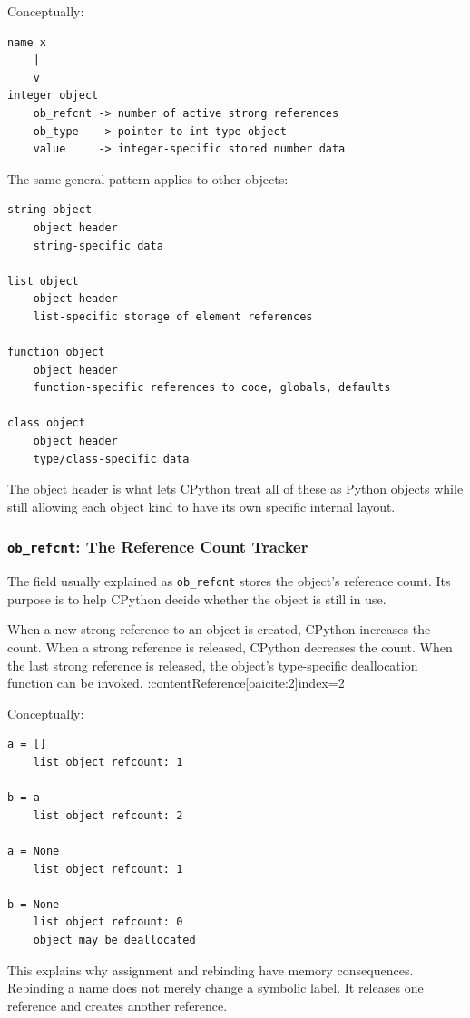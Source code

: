 Conceptually:

\begin{verbatim}
name x
    |
    v
integer object
    ob_refcnt -> number of active strong references
    ob_type   -> pointer to int type object
    value     -> integer-specific stored number data
\end{verbatim}

The same general pattern applies to other objects:

\begin{verbatim}
string object
    object header
    string-specific data

list object
    object header
    list-specific storage of element references

function object
    object header
    function-specific references to code, globals, defaults

class object
    object header
    type/class-specific data
\end{verbatim}

The object header is what lets CPython treat all of these as Python objects while still allowing each object kind to have its own specific internal layout.

\subsubsection*{\texttt{ob\_refcnt}: The Reference Count Tracker}

The field usually explained as \texttt{ob\_refcnt} stores the object's reference count. Its purpose is to help CPython decide whether the object is still in use.

When a new strong reference to an object is created, CPython increases the count. When a strong reference is released, CPython decreases the count. When the last strong reference is released, the object's type-specific deallocation function can be invoked. :contentReference[oaicite:2]{index=2}

Conceptually:

\begin{verbatim}
a = []
    list object refcount: 1

b = a
    list object refcount: 2

a = None
    list object refcount: 1

b = None
    list object refcount: 0
    object may be deallocated
\end{verbatim}

This explains why assignment and rebinding have memory consequences. Rebinding a name does not merely change a symbolic label. It releases one reference and creates another reference.


